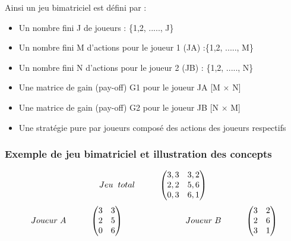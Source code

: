 \documentclass[a4paper, 12pt, twoside]{article}
\begin{document}
Ainsi un \textsf{jeu bimatriciel} est défini par :
\begin{itemize}
\item Un nombre fini J de joueurs : \{1,2, ....., J\}
\item Un nombre fini M d'actions pour le joueur 1 (JA) :\{1,2, ....., M\}
\item Un nombre fini N d'actions pour le joueur 2 (\textsf{JB}) : \{1,2, ....., N\}
\item Une matrice de gain (pay-off) G1 pour le joueur JA  [M $\times$ N]
\item Une matrice de gain (pay-off) G2 pour le joueur \textsf{JB}  [N $\times$ M]
\item Une stratégie pure par joueurs composé des actions des joueurs respectifs
\end{itemize}


\subsubsection{Exemple de jeu bimatriciel et illustration des concepts}

\[
Jeu \hspace{0,2cm} total \hspace{1cm}
\begin{pmatrix}
3,3 & 3,2\\
2,2 & 5,6\\
0,3 & 6,1\\
\end{pmatrix}\    
\]                  
\vspace{1 cm}
\[
Joueur\hspace{0,1cm} A\hspace{1cm}
\begin{pmatrix}3&3\\
2&5\\
0&6\\
\end{pmatrix}\                      \hspace{2,5cm}  
Joueur\hspace{0,1cm} B \hspace{1cm}  
\begin{pmatrix}3&2\\
2&6\\
3&1\\
\end{pmatrix} 
\]
\end{document}
